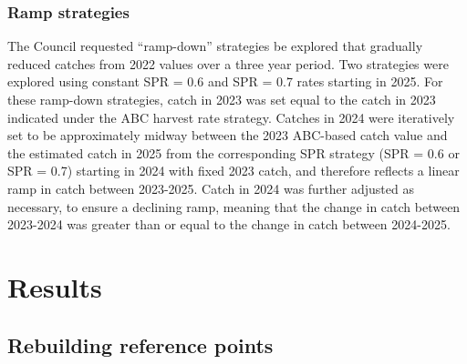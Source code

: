\documentclass[11pt,
  english,
  letterpaper,
]{article}
\begin{document}

\hypertarget{ramp-strategies}{%
\subsubsection{Ramp strategies}\label{ramp-strategies}}

\leavevmode\tagmcend\tagstructend


The Council requested ``ramp-down'' strategies be explored that gradually reduced catches from 2022 values over a three year period. Two strategies were explored using constant SPR = 0.6 and SPR = 0.7 rates starting in 2025. For these ramp-down strategies, catch in 2023 was set equal to the catch in 2023 indicated under the ABC harvest rate strategy. Catches in 2024 were iteratively set to be approximately midway between the 2023 ABC-based catch value and the estimated catch in 2025 from the corresponding SPR strategy (SPR = 0.6 or SPR = 0.7) starting in 2024 with fixed 2023 catch, and therefore reflects a linear ramp in catch between 2023-2025. Catch in 2024 was further adjusted as necessary, to ensure a declining ramp, meaning that the change in catch between 2023-2024 was greater than or equal to the change in catch between 2024-2025.

\leavevmode\tagmcend\tagstructend\par


\hypertarget{results}{%
\section{Results}\label{results}}

\leavevmode\tagmcend\tagstructend


\hypertarget{rebuilding-reference-points}{%
\subsection{Rebuilding reference points}\label{rebuilding-reference-points}}

\leavevmode\tagmcend\tagstructend

\end{document}
